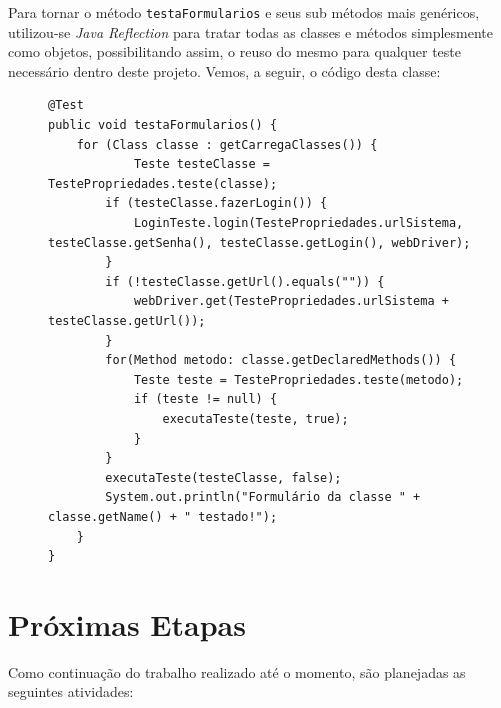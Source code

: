 \documentclass[tg]{mdtufsm}
\begin{document}
Para tornar o método \texttt{testaFormularios} e seus sub métodos mais genéricos, utilizou-se \emph{Java Reflection} para tratar todas as classes e métodos simplesmente como objetos, possibilitando assim, o reuso do mesmo para qualquer teste necessário dentro deste projeto. Vemos, a seguir, o código desta classe:

\begin{figure}[!htb]
\begin{lstlisting}
@Test
public void testaFormularios() {
	for (Class classe : getCarregaClasses()) {
    		Teste testeClasse = TestePropriedades.teste(classe);
        if (testeClasse.fazerLogin()) {
            LoginTeste.login(TestePropriedades.urlSistema, testeClasse.getSenha(), testeClasse.getLogin(), webDriver);
        }
        if (!testeClasse.getUrl().equals("")) {
            webDriver.get(TestePropriedades.urlSistema + testeClasse.getUrl());
        }
        for(Method metodo: classe.getDeclaredMethods()) {
            Teste teste = TestePropriedades.teste(metodo);
            if (teste != null) {    
                executaTeste(teste, true);
            }
        }
        executaTeste(testeClasse, false);
        System.out.println("Formulário da classe " + classe.getName() + " testado!");
	}     
}	
\end{lstlisting}
	\label{code:testaFormularios}
\end{figure}

\chapter{Próximas Etapas}
Como continuação do trabalho realizado até o momento, são planejadas as seguintes atividades:

\setlength{\baselineskip}{\baselineskip}


\end{document}
